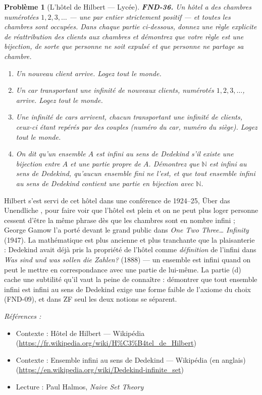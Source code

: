 \documentclass[11pt]{article}
\newtheorem{problem}{Problème}
\newenvironment{refs}{\par\small\noindent\emph{Références :}\begin{itemize}\setlength\itemsep{0pt}}{\end{itemize}\normalsize}
\begin{document}
\begin{problem}[{L'hôtel de Hilbert --- Lycée}]
\textbf{FND-36.} Un hôtel a des chambres numérotées $ 1, 2, 3, \ldots $ --- une par entier
strictement positif --- et toutes les chambres sont occupées. Dans chaque partie ci-dessous, donnez
une règle explicite de réattribution des clients aux chambres et \textit{démontrez} que votre règle
est une bijection, de sorte que personne ne soit expulsé et que personne ne partage sa chambre.
\begin{enumerate}
\item[(a)] Un nouveau client arrive. Logez tout le monde.
\item[(b)] Un car transportant une infinité de nouveaux clients, numérotés $ 1, 2, 3, \ldots $,
arrive. Logez tout le monde.
\item[(c)] Une infinité de cars arrivent, chacun transportant une infinité de clients, ceux-ci étant
repérés par des couples (numéro du car, numéro du siège). Logez tout le monde.
\item[(d)] On dit qu'un ensemble $ A $ est \textit{infini au sens de Dedekind} s'il existe une bijection
entre $ A $ et une partie propre de $ A $. Démontrez que $ \mathbb{N} $ est infini au sens
de Dedekind, qu'aucun ensemble fini ne l'est, et que tout ensemble infini au sens de Dedekind
contient une partie en bijection avec $ \mathbb{N} $.
\end{enumerate}

\end{problem}

\noindent Hilbert s'est servi de cet hôtel dans une conférence de 1924--25, \og{} Über das
Unendliche \fg{}, pour faire voir que \og{} l'hôtel est plein \fg{} et \og{} on ne peut plus loger personne \fg{}
cessent d'être la même phrase dès que les chambres sont en nombre infini ; George Gamow l'a porté
devant le grand public dans \textit{One Two Three\dots{} Infinity} (1947). La mathématique est plus
ancienne et plus tranchante que la plaisanterie : Dedekind avait déjà pris la propriété de
l'hôtel comme \textit{définition} de l'infini dans \textit{Was sind und was sollen die Zahlen?}
(1888) --- un ensemble est infini quand on peut le mettre en correspondance avec une partie de
lui-même. La partie (d) cache une subtilité qu'il vaut la peine de connaître : démontrer que tout
ensemble infini est infini au sens de Dedekind exige une forme faible de l'axiome du choix
(FND-09), et dans ZF seul les deux notions se séparent.

\begin{refs}
\item Contexte : Hôtel de Hilbert --- Wikipédia (\url{https://fr.wikipedia.org/wiki/H%C3%B4tel_de_Hilbert})
\item Contexte : Ensemble infini au sens de Dedekind --- Wikipédia (en anglais) (\url{https://en.wikipedia.org/wiki/Dedekind-infinite_set})
\item Lecture : Paul Halmos, \textit{Naive Set Theory}
\end{refs}
\end{document}
